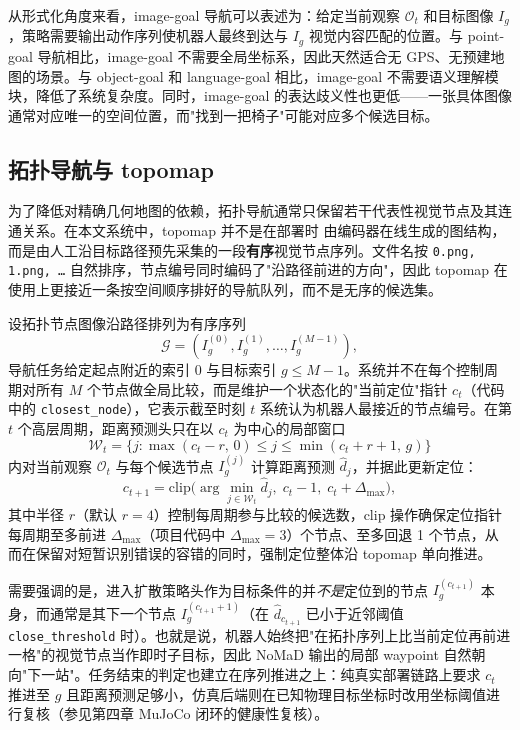 从形式化角度来看，image-goal 导航可以表述为：给定当前观察 $\mathcal{O}_t$ 和目标图像 $I_g$，策略需要输出动作序列使机器人最终到达与 $I_g$ 视觉内容匹配的位置。与 point-goal 导航相比，image-goal 不需要全局坐标系，因此天然适合无 GPS、无预建地图的场景。与 object-goal 和 language-goal 相比，image-goal 不需要语义理解模块，降低了系统复杂度。同时，image-goal 的表达歧义性也更低——一张具体图像通常对应唯一的空间位置，而"找到一把椅子"可能对应多个候选目标。

\subsection{拓扑导航与 topomap}

为了降低对精确几何地图的依赖，拓扑导航通常只保留若干代表性视觉节点及其连通关系\cite{savinov2018sptm,chaplot2020nts,shah2021ving}。在本文系统中，topomap 并不是在部署时
由编码器在线生成的图结构，而是由人工沿目标路径预先采集的一段\textbf{有序}视觉节点序列。文件名按 \texttt{0.png, 1.png, \ldots} 自然排序，节点编号同时编码了"沿路径前进的方向"，因此 topomap 在使用上更接近一条按空间顺序排好的导航队列，而不是无序的候选集。

设拓扑节点图像沿路径排列为有序序列
\begin{equation}
\mathcal{G}=(I_g^{(0)}, I_g^{(1)}, \ldots, I_g^{(M-1)}),
\end{equation}
导航任务给定起点附近的索引 $0$ 与目标索引 $g\le M-1$。系统并不在每个控制周期对所有 $M$ 个节点做全局比较，而是维护一个状态化的"当前定位"指针 $c_t$（代码中的 \texttt{closest\_node}），它表示截至时刻 $t$ 系统认为机器人最接近的节点编号。在第 $t$ 个高层周期，距离预测头只在以 $c_t$ 为中心的局部窗口
\begin{equation}
\mathcal{W}_t = \{j : \max(c_t-r,\,0) \le j \le \min(c_t+r+1,\,g)\}
\end{equation}
内对当前观察 $\mathcal{O}_t$ 与每个候选节点 $I_g^{(j)}$ 计算距离预测 $\hat d_j$，并据此更新定位：
\begin{equation}
c_{t+1} = \mathrm{clip}\bigl(\arg\min_{j\in\mathcal{W}_t} \hat d_j,\; c_t-1,\; c_t+\Delta_{\max}\bigr),
\end{equation}
其中半径 $r$（默认 $r=4$）控制每周期参与比较的候选数，clip 操作确保定位指针每周期至多前进 $\Delta_{\max}$（项目代码中 $\Delta_{\max}=3$）个节点、至多回退 1 个节点，从而在保留对短暂识别错误的容错的同时，强制定位整体沿 topomap 单向推进。

需要强调的是，进入扩散策略头作为目标条件的并\emph{不是}定位到的节点 $I_g^{(c_{t+1})}$ 本身，而通常是其下一个节点 $I_g^{(c_{t+1}+1)}$（在 $\hat d_{c_{t+1}}$ 已小于近邻阈值 \texttt{close\_threshold} 时）。也就是说，机器人始终把"在拓扑序列上比当前定位再前进一格"的视觉节点当作即时子目标，因此 NoMaD 输出的局部 waypoint 自然朝向"下一站"。任务结束的判定也建立在序列推进之上：纯真实部署链路上要求 $c_t$ 推进至 $g$ 且距离预测足够小，仿真后端则在已知物理目标坐标时改用坐标阈值进行复核（参见第四章 MuJoCo 闭环的健康性复核）。

